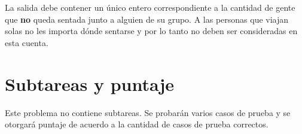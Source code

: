 \documentclass{oci}
\begin{document}
\begin{outputDescription}
  La salida debe contener un único entero correspondiente a la cantidad de
  gente que \textbf{no} queda sentada junto a alguien de su grupo.
  A las personas que viajan solas no les importa dónde sentarse y por lo tanto
  no deben ser consideradas en esta cuenta.
\end{outputDescription}

\section*{Subtareas y puntaje}
Este problema no contiene subtareas.
Se probarán varios casos de prueba y se otorgará puntaje de acuerdo a la
cantidad de casos de prueba correctos.

\begin{sampleDescription}
\end{sampleDescription}
\end{document}
